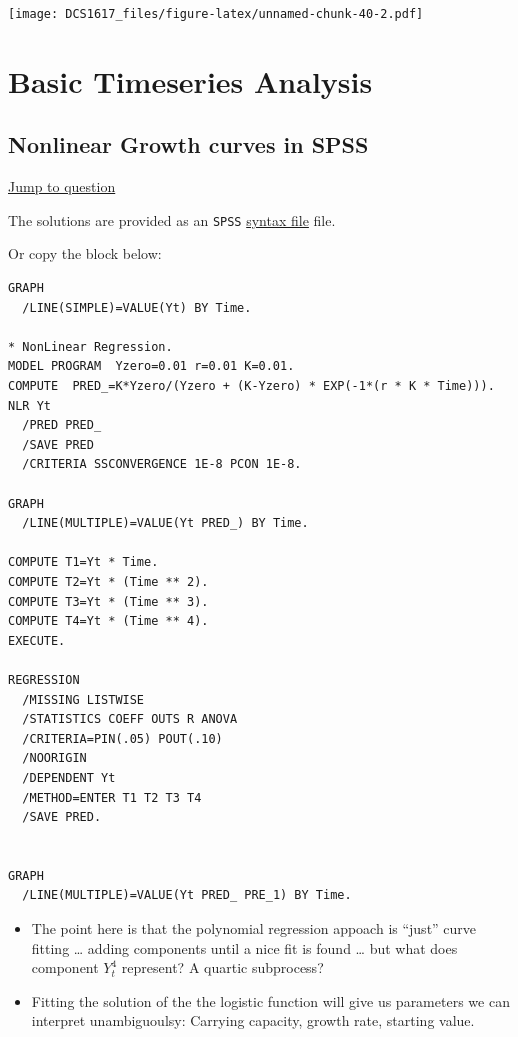 \documentclass[]{book}
\providecommand{\tightlist}{%
  \setlength{\itemsep}{0pt}\setlength{\parskip}{0pt}}
\let\stdsection\section
\renewcommand\section{\newpage\stdsection}
\begin{document}
\texttt{[image: DCS1617\_files/figure-latex/unnamed-chunk-40-2.pdf]}

\hypertarget{btasol}{\chapter{\texorpdfstring{\textbf{Basic Timeseries
Analysis}}{Basic Timeseries Analysis}}\label{btasol}}

\section{Nonlinear Growth curves in
SPSS}\label{nonlinear-growth-curves-in-spss}

\protect\hyperlink{bta}{\textbar{} Jump to question \textbar{}}

The solutions are provided as an \texttt{SPSS}
\href{https://raw.githubusercontent.com/FredHasselman/DCS/master/assignmentData/BasicTSA_nonlinreg/GrowthRegression_sol.sps}{syntax
file} file.

Or copy the block below:

\begin{verbatim}
GRAPH
  /LINE(SIMPLE)=VALUE(Yt) BY Time.

* NonLinear Regression.
MODEL PROGRAM  Yzero=0.01 r=0.01 K=0.01.
COMPUTE  PRED_=K*Yzero/(Yzero + (K-Yzero) * EXP(-1*(r * K * Time))).
NLR Yt
  /PRED PRED_
  /SAVE PRED
  /CRITERIA SSCONVERGENCE 1E-8 PCON 1E-8.

GRAPH
  /LINE(MULTIPLE)=VALUE(Yt PRED_) BY Time.

COMPUTE T1=Yt * Time.
COMPUTE T2=Yt * (Time ** 2).
COMPUTE T3=Yt * (Time ** 3).
COMPUTE T4=Yt * (Time ** 4).
EXECUTE.

REGRESSION
  /MISSING LISTWISE
  /STATISTICS COEFF OUTS R ANOVA
  /CRITERIA=PIN(.05) POUT(.10)
  /NOORIGIN 
  /DEPENDENT Yt
  /METHOD=ENTER T1 T2 T3 T4
  /SAVE PRED.


GRAPH
  /LINE(MULTIPLE)=VALUE(Yt PRED_ PRE_1) BY Time.
\end{verbatim}

\begin{itemize}
\tightlist
\item
  The point here is that the polynomial regression appoach is ``just''
  curve fitting \ldots{} adding components until a nice fit is found
  \ldots{} but what does component \(Y_t^4\) represent? A quartic
  subprocess?
\item
  Fitting the solution of the the logistic function will give us
  parameters we can interpret unambiguoulsy: Carrying capacity, growth
  rate, starting value.
\end{itemize}
\end{document}
